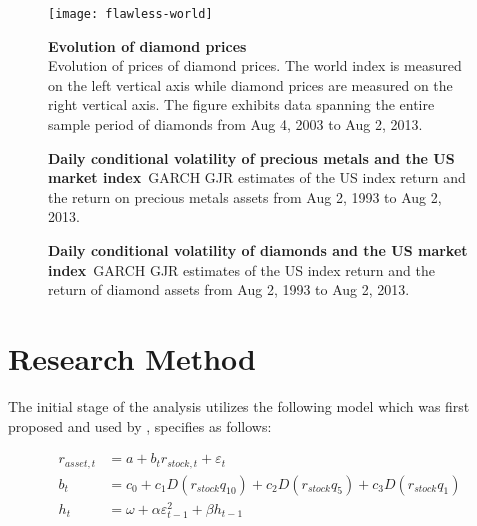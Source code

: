 \documentclass[preprint,authoryear,11pt]{elsarticle}
\begin{document}
\begin{figure}
	\centering
	\texttt{[image: flawless-world]}
	\captionsetup{labelfont=bf,font=footnotesize,skip=0.1cm}
	\caption{\textbf{Evolution of diamond prices }\\
		Evolution of prices of diamond prices. The world index is measured on the left vertical axis while diamond prices are measured on the right vertical axis. The figure exhibits data spanning the entire sample period of diamonds from Aug 4, 2003 to Aug 2, 2013. }
	\label{fig:flawless-world}
\end{figure}


\begin{figure}
	\centering
	\caption{\textbf{Daily conditional volatility of precious metals and the US market index}\
	 GARCH GJR estimates of the US index return and the return on precious metals assets from Aug 2, 1993 to Aug 2, 2013. }
	\label{fig:sp500Plot}
\end{figure}

\begin{figure}
	\centering
	\caption{\textbf{Daily conditional volatility of diamonds and the US market index}\
	 GARCH GJR estimates of the US index return and the return of diamond assets from Aug 2, 1993 to Aug 2, 2013. }
	\label{fig:sp500Plot}
\end{figure}

\section{Research Method}
\label{sec:research_method}


The initial stage of the analysis utilizes the following model which was first proposed and used by \citet{baur_is_2010}, specifies as follows:

\begin{align}
	 r_{asset,t} &= a + b_{t}r_{stock,t} + \varepsilon_{t} \label{eq:mean_equation}\\
	 b_{t} &= c_{0} + c_{1}D(r_{stock}q_{10}) + c_{2}D(r_{stock}q_{5}) + c_{3}D(r_{stock}q_{1}) \label{eq:bt}\\
	 h_{t} &= \omega + \alpha\varepsilon_{t-1}^2 + \beta h_{t-1} \label{eq:garch11}
\end{align}
\end{document}
